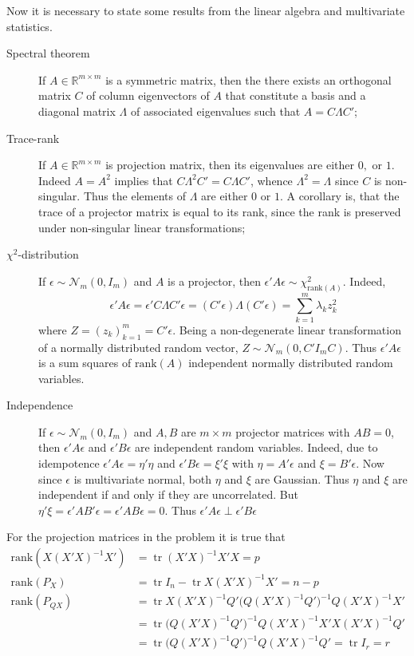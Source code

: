 \documentclass[a4paper]{article}
\newcommand{\Real}{\mathbb{R}}
\newcommand{\Tr}{\mathop{\text{tr}}\nolimits}
\begin{document}
\noindent Now it is necessary to state some results from the linear algebra and multivariate statistics.
\begin{description}
	\item[Spectral theorem] If $A\in \Real^{m\times m}$ is a symmetric matrix, then the there exists an orthogonal matrix $C$ of column eigenvectors of $A$ that constitute a basis and a diagonal matrix $\Lambda$ of associated eigenvalues such that $A = C\Lambda C'$;

	\item[Trace-rank] If $A\in \Real^{m\times m}$ is projection matrix, then its eigenvalues are either $0,$ or $1$. Indeed $A=A^2$ implies that $C\Lambda^2C' = C\Lambda C'$, whence $\Lambda^2 = \Lambda$ since $C$ is non-singular. Thus the elements of $\Lambda$ are either $0$ or $1$. A corollary is, that the trace of a projector matrix is equal to its rank, since the rank is preserved under non-singular linear transformations;

	\item[$\chi^2$-distribution] If $\epsilon\sim\mathcal{N}_m(0,I_m)$ and $A$ is a projector, then $\epsilon'A\epsilon \sim \chi^2_{\text{rank}(A)}$.
	Indeed,
	\[\epsilon'A\epsilon = \epsilon'C\Lambda C'\epsilon = (C'\epsilon) \Lambda (C'\epsilon) = \sum_{k=1}^m \lambda_k z_k^2\]
	where $Z = (z_k)_{k=1}^m = C'\epsilon$. Being a non-degenerate linear transformation of a normally distributed random vector, $Z\sim\mathcal{N}_m(0, C'I_m C)$. Thus $\epsilon'A\epsilon$ is a sum squares of $\text{rank}(A)$ independent normally distributed random variables.

	\item[Independence] If $\epsilon\sim\mathcal{N}_m(0,I_m)$ and $A,B$ are $m\times m$ projector matrices with $A B = 0$, then $\epsilon'A\epsilon$ and $\epsilon'B\epsilon$ are independent random variables.
	Indeed, due to idempotence $\epsilon'A\epsilon = \eta'\eta$ and $\epsilon'B\epsilon = \xi'\xi$ with $\eta = A'\epsilon$ and $\xi = B'\epsilon$.
	Now since $\epsilon$ is multivariate normal, both $\eta$ and $\xi$ are Gaussian. Thus $\eta$ and $\xi$ are independent if and only if they are uncorrelated. But $\eta'\xi = \epsilon'AB'\epsilon = \epsilon'AB\epsilon = 0$. Thus $\epsilon'A\epsilon\perp \epsilon'B\epsilon$
\end{description}

\noindent For the projection matrices in the problem it is true that
\begin{align*}
	\text{rank} ( X(X'X)^{-1}X' ) &= \Tr (X'X)^{-1}X'X = p \\
	\text{rank} (P_X) &= \Tr I_n - \Tr X(X'X)^{-1}X' = n-p \\
	\text{rank} (P_{QX})
	&= \Tr X(X'X)^{-1}Q'\big(Q(X'X)^{-1}Q'\big)^{-1}Q(X'X)^{-1}X' \\
	&= \Tr \big(Q(X'X)^{-1}Q'\big)^{-1}Q(X'X)^{-1}X'X(X'X)^{-1}Q' \\
	&= \Tr \big(Q(X'X)^{-1}Q'\big)^{-1}Q(X'X)^{-1}Q' = \Tr I_r = r
\end{align*}
\end{document}
